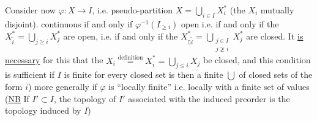 Consider now $\varphi:X\longrightarrow I$, i.e.  pseudo-partition  $X=\bigcup_{i\in I}X_i^*$
(the $X_i$ mutually disjoint).  continuous if and only if
$\varphi^{-1}(I_{\geq i})$ open
 i.e. if and only if the $X_{\widetilde i}^*=\bigcup_{j\geq i}X_j^*$ are open, i.e. if and only if the
$X_{\complement\widetilde i}^*=\bigcup_{\substack{j\in I\\j\not\geq i}}X_j^*$
are closed. It \uline{is necessary} for this that the
$X_i\overset{\mathrm{definition}}=X_{\overline i}^*=\bigcup_{j\leq i}X_j$
be closed, and this condition is sufficient
if $I$ is finite for every closed set  is then a finite $\bigcup$ of closed sets of the form $\overline i$)
more generally if $\varphi$ is ``locally finite'' i.e. locally with a finite set of values
(\uline{NB} If $I'\subset I$, the topology of $I'$ associated with the induced preorder is the topology induced
by $I$)


